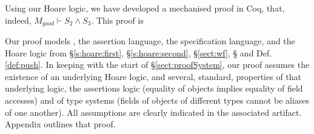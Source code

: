 Using our Hoare logic, we have developed a mechanised proof in Coq, that, indeed, $M_{good} \vdash S_2 \wedge S_3$.
This proof is 
 
 Our proof models  \LangOO, the assertion language, the specification language, and the Hoare logic from \S \ref{s:hoare:first},  \S   \ref{s:hoare:second},  \S  \ref{sect:wf},  \S {} and Def. \ref{def:push}.
In keeping with   the start of  \S \ref{sect:proofSystem}, our proof assumes the existence of an underlying Hoare logic,  
and several, standard, properties of that underlying logic, the assertions logic (\eg equality of objects implies equality of field accesses) and of type systems
(\eg  fields of objects of different types cannot be aliases of one another).
All assumptions  are clearly indicated in the associated artifact.
 Appendix   %
outlines   that proof. 

